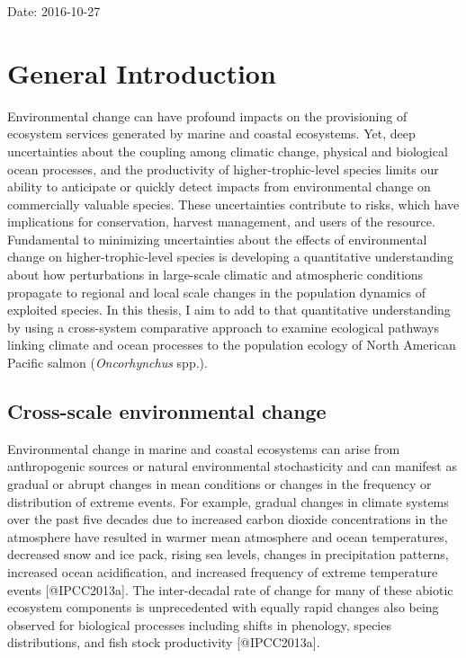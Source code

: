 Date: 2016-10-27

\chapter{General Introduction}\label{general-introduction}

Environmental change can have profound impacts on the provisioning of
ecosystem services generated by marine and coastal ecosystems. Yet, deep
uncertainties about the coupling among climatic change, physical and
biological ocean processes, and the productivity of higher-trophic-level
species limits our ability to anticipate or quickly detect impacts from
environmental change on commercially valuable species. These
uncertainties contribute to risks, which have implications for
conservation, harvest management, and users of the resource. Fundamental
to minimizing uncertainties about the effects of environmental change on
higher-trophic-level species is developing a quantitative understanding
about how perturbations in large-scale climatic and atmospheric
conditions propagate to regional and local scale changes in the
population dynamics of exploited species. In this thesis, I aim to add
to that quantitative understanding by using a cross-system comparative
approach to examine ecological pathways linking climate and ocean
processes to the population ecology of North American Pacific salmon
(\emph{Oncorhynchus} spp.).

\section{Cross-scale environmental
change}\label{cross-scale-environmental-change}

Environmental change in marine and coastal ecosystems can arise from
anthropogenic sources or natural environmental stochasticity and can
manifest as gradual or abrupt changes in mean conditions or changes in
the frequency or distribution of extreme events. For example, gradual
changes in climate systems over the past five decades due to increased
carbon dioxide concentrations in the atmosphere have resulted in warmer
mean atmosphere and ocean temperatures, decreased snow and ice pack,
rising sea levels, changes in precipitation patterns, increased ocean
acidification, and increased frequency of extreme temperature events
{[}@IPCC2013a{]}. The inter-decadal rate of change for many of these
abiotic ecosystem components is unprecedented with equally rapid changes
also being observed for biological processes including shifts in
phenology, species distributions, and fish stock productivity
{[}@IPCC2013a{]}.

